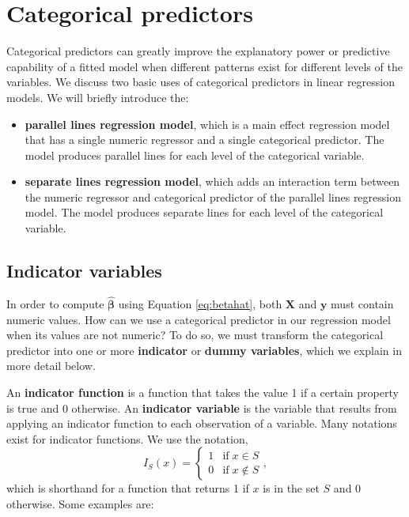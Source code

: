 \documentclass[
]{book}
\providecommand{\tightlist}{%
  \setlength{\itemsep}{0pt}\setlength{\parskip}{0pt}}
\theoremstyle{definition}
\theoremstyle{definition}
\theoremstyle{definition}
\theoremstyle{definition}
\theoremstyle{remark}
\begin{document}
\hypertarget{categorical-predictors}{%
\section{Categorical predictors}\label{categorical-predictors}}

Categorical predictors can greatly improve the explanatory power or predictive capability of a fitted model when different patterns exist for different levels of the variables. We discuss two basic uses of categorical predictors in linear regression models. We will briefly introduce the:

\begin{itemize}
\tightlist
\item
  \textbf{parallel lines regression model}, which is a main effect regression model that has a single numeric regressor and a single categorical predictor. The model produces parallel lines for each level of the categorical variable.
\item
  \textbf{separate lines regression model}, which adds an interaction term between the numeric regressor and categorical predictor of the parallel lines regression model. The model produces separate lines for each level of the categorical variable.
\end{itemize}

\hypertarget{indicator-variables}{%
\subsection{Indicator variables}\label{indicator-variables}}

In order to compute \(\hat{\boldsymbol{\beta}}\) using Equation \eqref{eq:betahat}, both \(\mathbf{X}\) and \(\mathbf{y}\) must contain numeric values. How can we use a categorical predictor in our regression model when its values are not numeric? To do so, we must transform the categorical predictor into one or more \textbf{indicator} or \textbf{dummy variables}, which we explain in more detail below.

An \textbf{indicator function} is a function that takes the value 1 if a certain property is true and 0 otherwise. An \textbf{indicator variable} is the variable that results from applying an indicator function to each observation of a variable. Many notations exist for indicator functions. We use the notation,
\[
I_S(x) =
\begin{cases}
1 & \textrm{if}\;x \in S\\
0 & \textrm{if}\;x \notin S
\end{cases},
\]
which is shorthand for a function that returns 1 if \(x\) is in the set \(S\) and 0 otherwise. Some examples are:
\end{document}
